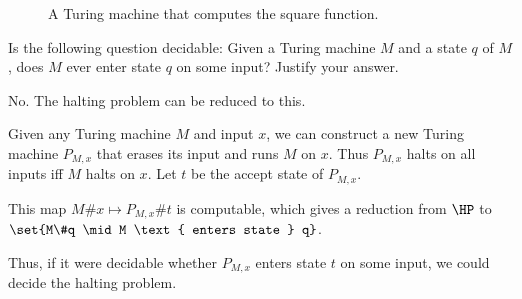 \documentclass[12pt]{article}
\begin{document}
\begin{solution}
\begin{figure}
        \caption{A Turing machine that computes the square function.}
        \label{fig:square}
    \end{figure}
\end{solution}

\begin{problem*}
    Is the following question decidable:
    Given a Turing machine $M$ and a state $q$ of $M$,
    does $M$ ever enter state $q$ on some input? Justify your answer.
\end{problem*}
\begin{solution}
    No.
    The halting problem can be reduced to this.

    Given any Turing machine $M$ and input $x$, we can construct a new
    Turing machine $P_{M, x}$ that erases its input and runs $M$ on $x$.
    Thus $P_{M, x}$ halts on all inputs iff $M$ halts on $x$.
    Let $t$ be the accept state of $P_{M, x}$.

    This map $M\#x \mapsto P_{M, x}\#t$ is computable, which gives a reduction
    from $\HP$ to $\set{M\#q \mid M \text{ enters state } q}$.

    Thus, if it were decidable whether $P_{M, x}$ enters state $t$ on some
    input, we could decide the halting problem.
\end{solution}
\end{document}
